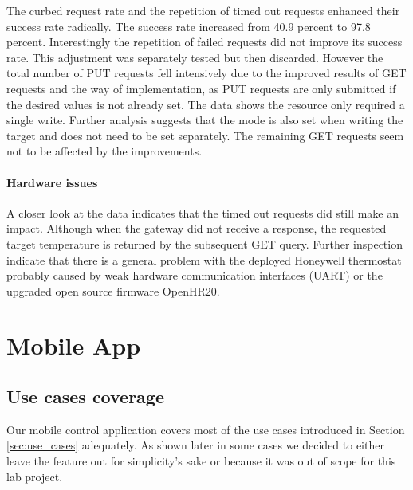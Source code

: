 The curbed request rate and the repetition of timed out  requests enhanced their success rate radically.
The success rate increased from 40.9 percent to 97.8 percent.
Interestingly the repetition of failed  requests did not improve its success rate.
This adjustment was separately tested but then discarded.
However the total number of PUT requests fell intensively due to the improved results of GET requests and the way of implementation, as PUT requests are only submitted if the desired values is not already set.
The data shows the resource  only required a single write.
Further analysis suggests that the mode is also set when writing the target and does not need to be set separately.
The remaining GET requests seem not to be affected by the improvements.

\paragraph{Hardware issues}

A closer look at the data indicates that the timed out  requests did still make an impact.
Although when the gateway did not receive a response, the requested target temperature is returned by the subsequent GET query.
Further inspection indicate that there is a general problem with the deployed Honeywell thermostat probably caused by weak hardware communication interfaces (UART) or the upgraded open source firmware OpenHR20.


\section{Mobile App}
\label{sec:eval_mobile_app}

\subsection {Use cases coverage}
Our mobile control application covers most of the use cases introduced in Section \ref{sec:use_cases} adequately. As shown later in some cases we decided to either leave the feature out for simplicity's sake or because it was out of scope for this lab project.

